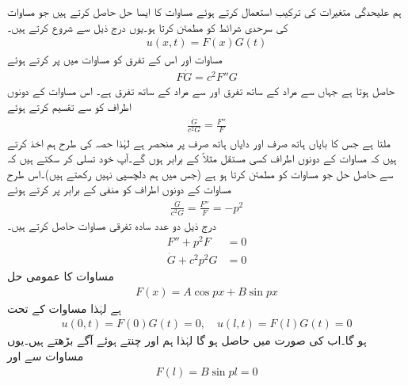  \quad ہم علیحدگی متغیرات کی ترکیب استعمال کرتے ہوئے مساوات  کا ایسا حل حاصل کرتے ہیں جو مساوات  کی سرحدی شرائط کو مطمئن کرتا ہو۔یوں درج ذیل سے شروع کرتے ہیں۔
\begin{align}\label{مساوات_جزوی_حل_حرارت_الف}
u(x,t)=F(x)G(t)
\end{align} 
مساوات  اور اس کے تفرق کو مساوات  میں پر کرتے ہوئے
\begin{align*}
F\dot{G}=c^2F''G
\end{align*}
حاصل ہوتا ہے  جہاں  سے مراد  کے ساتھ تفرق اور  سے مراد  کے ساتھ تفرق ہے۔ اس مساوات کے دونوں اطراف کو  سے تقسیم کرتے ہوئے
\begin{align}\label{مساوات_جزوی_حل_حرارت_ب}
\frac{\dot{G}}{c^2G}=\frac{F''}{F}
\end{align} 
ملتا ہے جس کا بایاں ہاتھ صرف  اور دایاں ہاتھ صرف  پر منحصر ہے لہٰذا حصہ  کی طرح  ہم اخذ کرتے ہیں کہ  مساوات  کے دونوں اطراف کسی مستقل مثلاً  کے برابر ہوں گے۔آپ خود تسلی کر سکتے ہیں کہ  سے حاصل حل  جو مساوات  کو مطمئن کرتا ہو  ہے (جس میں ہم دلچسپی نہیں رکھتے ہیں)۔اس طرح  مساوات  کے دونوں اطراف کو منفی  کے برابر پر کرتے ہوئے
\begin{align*}
\frac{\dot{G}}{c^2G}=\frac{F''}{F}=-p^2
\end{align*}
 درج ذیل دو عدد سادہ تفرقی مساوات حاصل کرتے ہیں۔
\begin{align}
F''+p^2F&=0\label{مساوات_جزوی_حل_حرارت_پ}\\
\dot{G}+c^2p^2G&=0\label{مساوات_جزوی_حل_حرارت_ت}
\end{align}
\quad مساوات  کا عمومی حل
\begin{align}\label{مساوات_جزوی_حل_حرارت_ٹ}
F(x)=A\cos px+B\sin px
\end{align}
ہے لہٰذا مساوات  کے تحت
\begin{align*}
u(0,t)=F(0)G(t)=0,\quad u(l,t)=F(l)G(t)=0
\end{align*}
ہو گا۔اب  کی صورت میں    حاصل ہو گا لہٰذا ہم  اور  چنتے ہوئے آگے بڑھتے ہیں۔یوں مساوات  سے  اور
\begin{align*}
F(l)=B\sin pl=0
\end{align*}
